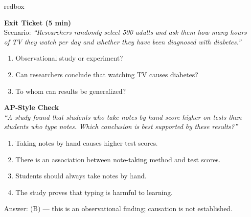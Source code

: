 \documentclass[10pt]{article}
\begin{document}
\begin{skillbox}{redbox}
\begin{minipage}[t]{0.48\linewidth}
    \textbf{Exit Ticket (5 min)}\\
    Scenario: \textit{``Researchers randomly select 500 adults and ask them how
    many hours of TV they watch per day and whether they have been diagnosed with
    diabetes.''}
    \begin{enumerate}
        \item Observational study or experiment?
        \item Can researchers conclude that watching TV causes diabetes?
        \item To whom can results be generalized?
    \end{enumerate}
\end{minipage}
\hfill
\begin{minipage}[t]{0.48\linewidth}
    \textbf{AP-Style Check}\\
    \textit{``A study found that students who take notes by hand score higher on
    tests than students who type notes. Which conclusion is best supported by
    these results?''}
    \begin{enumerate}[label=(\Alph*)]
        \item Taking notes by hand causes higher test scores.
        \item There is an association between note-taking method and test scores.
        \item Students should always take notes by hand.
        \item The study proves that typing is harmful to learning.
    \end{enumerate}
    Answer: (B) --- this is an observational finding; causation is not established.
\end{minipage}
\end{skillbox}
\end{document}
